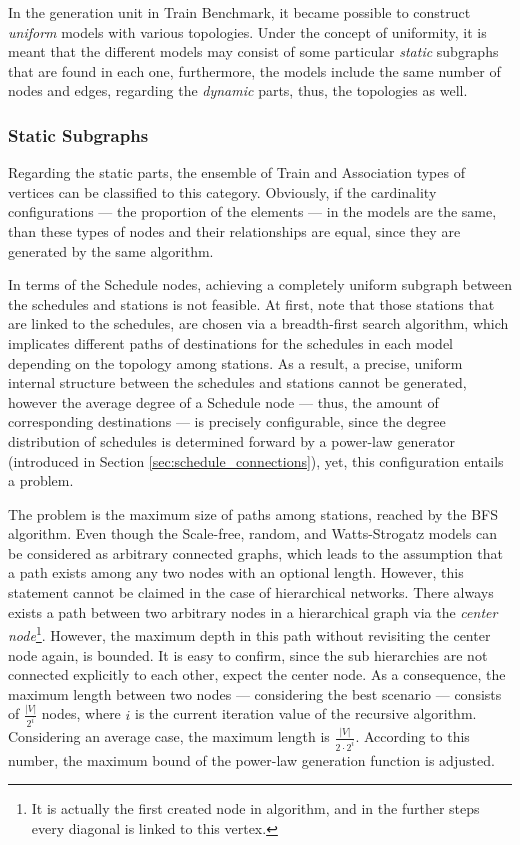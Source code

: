 In the generation unit in Train Benchmark, it became possible to construct \textit{uniform} models with various topologies. Under the concept of uniformity, it is meant that the different models may consist of some particular \textit{static} subgraphs that are found in each one, furthermore, the models include the same number of nodes and edges, regarding the \textit{dynamic} parts, thus, the topologies as well.


\subsubsection{Static Subgraphs}
Regarding the static parts, the ensemble of \textsf{Train} and \textsf{Association} types of vertices can be classified to this category. Obviously, if the cardinality configurations --- the proportion of the elements --- in the models are the same, than these types of nodes and their relationships are equal, since they are generated by the same algorithm.

In terms of the \textsf{Schedule} nodes, achieving a completely uniform subgraph between the schedules and stations is not feasible. At first, note that those stations that are linked to the schedules, are chosen via a breadth-first search algorithm, which implicates different paths of destinations for the schedules in each model depending on the topology among stations. As a result, a precise, uniform internal structure between the schedules and stations cannot be generated, however the average degree of a \textsf{Schedule} node --- thus, the amount of corresponding destinations --- is precisely configurable, since the degree distribution of schedules is determined forward by a power-law generator (introduced in Section \ref{sec:schedule_connections}), yet, this configuration entails a problem.

The problem is the maximum size of paths among stations, reached by the BFS algorithm. Even though the Scale-free, random, and Watts-Strogatz models can be considered as arbitrary connected graphs, which leads to the assumption that a path exists among any two nodes with an optional length. However, this statement cannot be claimed in the case of hierarchical networks. There always exists a path between two arbitrary nodes in a hierarchical graph via the \textit{center node}\footnote{It is actually the first created node in algorithm, and in the further steps every diagonal is linked to this vertex.}. However, the maximum depth in this path without revisiting the center node again, is bounded. It is easy to confirm, since the sub hierarchies are not connected explicitly to each other, expect the center node. As a consequence, the maximum length between two nodes --- considering the best scenario --- consists of $\frac{|V|}{2^i}$ nodes, where $i$ is the current iteration value of the recursive algorithm. Considering an average case, the maximum length is $\frac{|V|}{2 \cdot 2^i}$. According to this number, the maximum bound of the power-law generation function is adjusted.


